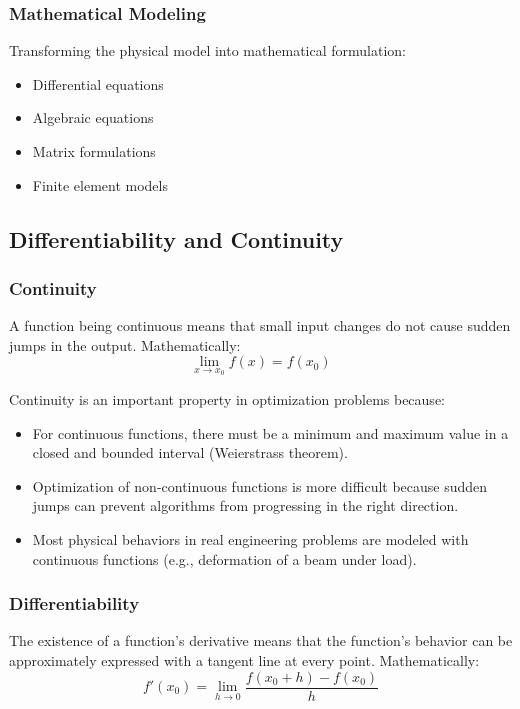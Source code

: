 \subsubsection{Mathematical Modeling}
Transforming the physical model into mathematical formulation:
\begin{itemize}
    \item Differential equations
    \item Algebraic equations
    \item Matrix formulations
    \item Finite element models
\end{itemize}

\subsection{Differentiability and Continuity}

\subsubsection{Continuity}
A function being continuous means that small input changes do not cause sudden jumps in the output. Mathematically:
\begin{equation}
\lim_{x \to x_0} f(x) = f(x_0)
\end{equation}

\begin{tcolorbox}[title=Relationship Between Continuity and Optimization]
Continuity is an important property in optimization problems because:
\begin{itemize}
    \item For continuous functions, there must be a minimum and maximum value in a closed and bounded interval (Weierstrass theorem).
    \item Optimization of non-continuous functions is more difficult because sudden jumps can prevent algorithms from progressing in the right direction.
    \item Most physical behaviors in real engineering problems are modeled with continuous functions (e.g., deformation of a beam under load).
\end{itemize}
\end{tcolorbox}

\subsubsection{Differentiability}
The existence of a function's derivative means that the function's behavior can be approximately expressed with a tangent line at every point. Mathematically:
\begin{equation}
f'(x_0) = \lim_{h \to 0} \frac{f(x_0 + h) - f(x_0)}{h}
\end{equation}

